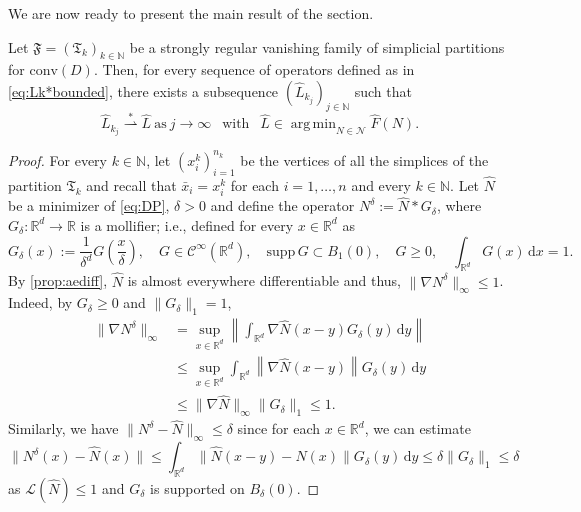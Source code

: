 \documentclass[onefignum,onetabnum]{siamonline250211}
\newcommand{\weakk}{\stackrel{\ast}{\rightharpoonup}}
\newcommand{\R}{\mathbb{R}}
\DeclareMathOperator*{\argmin}{arg\,min}
\begin{document}
We are now ready to present the main result of the section.
\begin{theorem}\label{thm:density} Let $\mathfrak{F}=(\mathfrak{T}_k)_{k\in \mathbb{N}}$ be a strongly regular vanishing family of simplicial partitions for $\mathrm{conv}(D)$. Then, for every sequence of operators defined as in \cref{eq:Lk*bounded}, there exists a subsequence $(\widehat{L}_{k_j})_{j\in\mathbb{N}}$ such that
\[ \widehat{L}_{k_j}\weakk \widehat{L} \ \text{as} \ j \to \infty \ \ \text{ with } \ \ \widehat{L}\in\argmin_{N\in\mathcal{N}}\widehat{F}(N).\]
\end{theorem}
\begin{proof}
For every $k\in\mathbb{N}$, let $(x_i^k)_{i=1}^{n_k}$ be the vertices of all the simplices of the partition $\mathfrak{T}_k$ and recall that $\bar x_i=x_i^k$ for each $i=1,\ldots, n$ and every $k\in\mathbb{N}$. Let $\widehat{N}$ be a minimizer of \cref{eq:DP}, $\delta > 0$ and define the operator $N^\delta:=\widehat{N}\ast G_\delta$, where $G_\delta:\R^d\to\R$ is a mollifier; i.e., defined for every $x\in\R^d$ as
$$
G_\delta(x):=\frac{1}{\delta^d}G\left(\frac{x}{\delta}\right), \quad G\in \mathcal{C}^\infty(\R^d),\quad \mathrm{supp} \, G\subset B_1(0),\quad G\geq 0, \quad \int_{\R^d} G(x) \, \mathrm{d}x=1.
$$
By \cref{prop:aediff}, $\widehat{N}$ is almost everywhere differentiable and thus, $\|\nabla N^\delta\|_\infty\leq 1$. Indeed, by $G_\delta \geq 0$ and $\| G_\delta \|_1 = 1$,
$$
\begin{aligned}
\|\nabla N^\delta\|_\infty &=\sup_{x\in\R^d} \left\|\int_{\R^d}\nabla \widehat{N}(x-y) G_\delta(y) \, \mathrm{d}y \right\| \\
&\leq \sup_{x\in\R^d}\int_{\R^d} \left\| \nabla \widehat{N}(x-y) \right\| G_\delta(y) \, \mathrm{d}y\\
&\leq \|\nabla \widehat{N}\|_\infty\|G_\delta\|_1\leq 1.
\end{aligned}
$$
Similarly, we have $\|N^\delta - \widehat{N}\|_\infty \leq \delta$ since for each $x \in \mathbb{R}^d$, we can estimate 
\[
\|N^\delta(x) - \widehat{N}(x)\| \leq \int_{\mathbb{R}^d} \|\widehat{N}(x - y) - \widehat{N}(x)\| G_\delta(y) \, \mathrm{d}y
\leq \delta \|G_\delta\|_1 \leq \delta
\]
as $\mathcal{L}(\widehat{N}) \leq 1$ and $G_\delta$ is supported on $B_\delta(0)$.


\end{proof}
\end{document}
